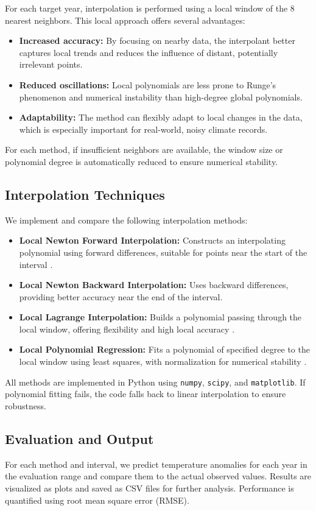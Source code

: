For each target year, interpolation is performed using a local window of the 8 nearest neighbors. This local approach offers several advantages:
\begin{itemize}
    \item \textbf{Increased accuracy:} By focusing on nearby data, the interpolant better captures local trends and reduces the influence of distant, potentially irrelevant points.
    \item \textbf{Reduced oscillations:} Local polynomials are less prone to Runge's phenomenon and numerical instability than high-degree global polynomials.
    \item \textbf{Adaptability:} The method can flexibly adapt to local changes in the data, which is especially important for real-world, noisy climate records.
\end{itemize}
For each method, if insufficient neighbors are available, the window size or polynomial degree is automatically reduced to ensure numerical stability.

\subsection{Interpolation Techniques}

We implement and compare the following interpolation methods:
\begin{itemize}
    \item \textbf{Local Newton Forward Interpolation:} Constructs an interpolating polynomial using forward differences, suitable for points near the start of the interval \cite{atkinson1989introduction, burden2011numerical}.
    \item \textbf{Local Newton Backward Interpolation:} Uses backward differences, providing better accuracy near the end of the interval.
    \item \textbf{Local Lagrange Interpolation:} Builds a polynomial passing through the local window, offering flexibility and high local accuracy \cite{atkinson1989introduction}.
    \item \textbf{Local Polynomial Regression:} Fits a polynomial of specified degree to the local window using least squares, with normalization for numerical stability \cite{brown2021polynomial}.
\end{itemize}

All methods are implemented in Python using \texttt{numpy}, \texttt{scipy}, and \texttt{matplotlib}. If polynomial fitting fails, the code falls back to linear interpolation to ensure robustness.

\subsection{Evaluation and Output}

For each method and interval, we predict temperature anomalies for each year in the evaluation range and compare them to the actual observed values. Results are visualized as plots and saved as CSV files for further analysis. Performance is quantified using root mean square error (RMSE).